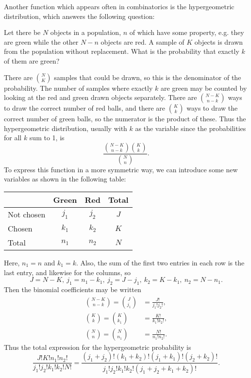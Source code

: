\documentclass{article}
\begin{document}
  Another function which appears often in combinatorics
  is the hypergeometric distribution,
  which answers the following question:
  \begin{center}
    Let there be $N$ objects in a population,
    $n$ of which have some property,
    e.g. they are green while the other $N-n$ objects are red.
    A sample of $K$ objects is drawn from the population without replacement.
    What is the probability that exactly $k$ of them are green?
  \end{center}
  There are $\binom{N}{K}$ samples that could be drawn,
  so this is the denominator of the probability.
  The number of samples where exactly $k$ are green
  may be counted by looking at the red and green drawn objects separately.
  There are $\binom{N-K}{n-k}$ ways to draw the correct number of red balls,
  and there are $\binom{K}{k}$ ways to draw the correct number of green balls,
  so the numerator is the product of these.
  Thus the hypergeometric distribution,
  usually with $k$ as the variable since the probabilities for all $k$ sum to 1, is
  \[\frac{{N-K \choose n-k}{K \choose k}}{{N \choose n}}.\]
  To express this function in a more symmetric way,
  we can introduce some new variables
  as shown in the following table:
  \begin{center}
    \begin{tabular}{|l|c|c|c|}
      \hline
      & Green & Red & Total \\ \hline
      Not chosen & $j_1$ & $j_2$ & $J$ \\ \hline
      Chosen & $k_1$ & $k_2$ & $K$ \\ \hline
      Total & $n_1$ & $n_2$ & $N$ \\ \hline
    \end{tabular}
  \end{center}
  Here, $n_1=n$ and $k_1=k$.
  Also, the sum of the first two entries in each row is the last entry,
  and likewise for the columns,
  so
  \[J=N-K,\ j_1=n_1-k_1,\ j_2=J-j_1,\ k_2=K-k_1,\ n_2=N-n_1.\]
  Then the binomial coefficients may be written
  \begin{align*}
  \binom{N-K}{n-k} = \binom{J}{j_1} &= \frac{J!}{j_1!j_2!}, \\
  \binom{K}{k} = \binom{K}{k_1} &= \frac{K!}{k_1!k_2!}, \\
  \binom{N}{n} = \binom{N}{n_1} &= \frac{N!}{n_1!n_2!}.
  \end{align*}
  Thus the total expression for the hypergeometric probability is
  \[
  \frac{J!K!n_1!n_2!}{j_1!j_2!k_1!k_2!N!}
  =\frac{(j_1+j_2)!(k_1+k_2)!(j_1+k_1)!(j_2+k_2)!}{j_1!j_2!k_1!k_2!(j_1+j_2+k_1+k_2)!}.
  \]
\end{document}
